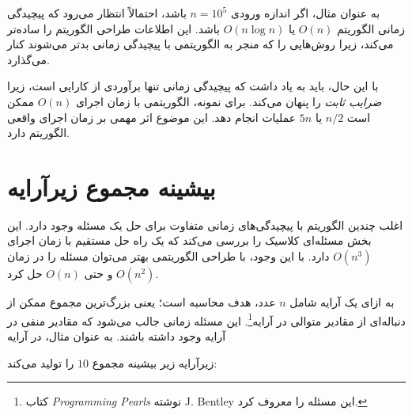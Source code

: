 به عنوان مثال، اگر اندازه ورودی $n=10^5$ باشد،
احتمالاً انتظار می‌رود که پیچیدگی زمانی
الگوریتم $O(n)$ یا $O(n \log n)$ باشد.
این اطلاعات طراحی الگوریتم را ساده‌تر می‌کند،
زیرا روش‌هایی را که منجر به الگوریتمی
با پیچیدگی زمانی بدتر می‌شوند کنار می‌گذارد.


با این حال، باید به یاد داشت که
پیچیدگی زمانی تنها برآوردی از کارایی است،
زیرا \emph{ضرایب ثابت} را پنهان می‌کند.
برای نمونه، الگوریتمی با زمان اجرای $O(n)$
ممکن است $n/2$ یا $5n$ عملیات انجام دهد.
این موضوع اثر مهمی بر زمان اجرای واقعی
الگوریتم دارد.

\section{بیشینه مجموع زیرآرایه}


اغلب چندین الگوریتم با پیچیدگی‌های زمانی
متفاوت برای حل یک مسئله وجود دارد.
این بخش مسئله‌ای کلاسیک را بررسی می‌کند که
یک راه حل مستقیم با زمان اجرای $O(n^3)$ دارد.
با این وجود، با طراحی الگوریتمی بهتر می‌توان
مسئله را در زمان $O(n^2)$ و حتی $O(n)$ حل کرد.

به ازای یک آرایه شامل $n$ عدد،
هدف محاسبه  است؛ یعنی
بزرگ‌ترین مجموع ممکن از دنباله‌ای از مقادیر متوالی
در آرایه\footnote{کتاب \emph{Programming Pearls} نوشته J. Bentley \cite{ben86} این مسئله را معروف کرد.}.
این مسئله زمانی جالب می‌شود که مقادیر منفی
در آرایه وجود داشته باشند.
به عنوان مثال، در آرایه
\begin{center}
\end{center}
\begin{samepage}
زیرآرایه زیر بیشینه مجموع $10$ را تولید می‌کند:
\begin{center}
\end{center}
\end{samepage}

